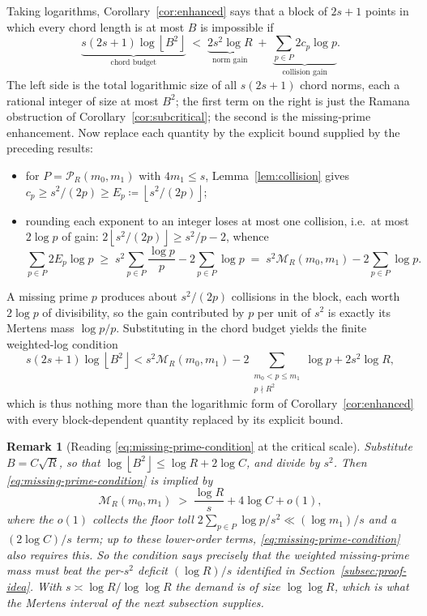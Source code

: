 \documentclass[11pt]{article}
\newtheorem{remark}[theorem]{Remark}
\newcommand{\floor}[1]{\left\lfloor #1 \right\rfloor}
\newcommand{\M}{\mathcal M}
\begin{document}
Taking logarithms, Corollary~\ref{cor:enhanced} says that a block of \(2s+1\) points in which every chord length is at most \(B\) is impossible if
\[
  \underbrace{s(2s+1)\log \floor{B^2}}_{\text{chord budget}}
  \;<\;
  \underbrace{2s^2\log R}_{\text{norm gain}}
  \;+\;
  \underbrace{\sum_{p\in P}2c_p\log p}_{\text{collision gain}}.
\]
The left side is the total logarithmic size of all \(s(2s+1)\) chord norms, each a rational integer of size at most \(B^2\); the first term on the right is just the Ramana obstruction of Corollary~\ref{cor:subcritical}; the second is the missing-prime enhancement.
Now replace each quantity by the explicit bound supplied by the preceding results:
\begin{itemize}[leftmargin=2em]
\item for \(P=\mathcal P_R(m_0,m_1)\) with \(4m_1\le s\), Lemma~\ref{lem:collision} gives \(c_p\ge s^2/(2p)\ge E_p\coloneq\floor{s^2/(2p)}\);
\item rounding each exponent to an integer loses at most one collision, i.e.\ at most \(2\log p\) of gain: \(2\floor{s^2/(2p)}\ge s^2/p-2\), whence
\[
  \sum_{p\in P}2E_p\log p
  \;\ge\;
  s^2\sum_{p\in P}\frac{\log p}{p}-2\sum_{p\in P}\log p
  \;=\;
  s^2\M_R(m_0,m_1)-2\sum_{p\in P}\log p .
\]
\end{itemize}
A missing prime \(p\) produces about \(s^2/(2p)\) collisions in the block, each worth \(2\log p\) of divisibility, so the gain contributed by \(p\) per unit of \(s^2\) is exactly its Mertens mass \(\log p/p\).
Substituting in the chord budget yields the finite weighted-log condition
\[
  s(2s+1)\log \floor{B^2}
  <
  s^2\M_R(m_0,m_1)-2\sum_{\substack{m_0<p\le m_1\\p\nmid R^2}}\log p
  +2s^2\log R ,
  \tag{MP}\label{eq:missing-prime-condition}
\]
which is thus nothing more than the logarithmic form of Corollary~\ref{cor:enhanced} with every block-dependent quantity replaced by its explicit bound.

\begin{remark}[Reading \eqref{eq:missing-prime-condition} at the critical
scale]\label{rem:mp-critical} Substitute \(B=C\sqrt R\), so that \(\log\floor{B^2}\le\log R+2\log C\), and divide by \(s^2\).
Then \eqref{eq:missing-prime-condition} is implied by
\[
  \M_R(m_0,m_1)
  \;>\;
  \frac{\log R}{s}+4\log C+o(1),
\]
where the \(o(1)\) collects the floor toll \(2\sum_{p\in P}\log p/s^2\ll(\log m_1)/s\) and a \((2\log C)/s\) term; up to these lower-order terms, \eqref{eq:missing-prime-condition} also requires this.
So the condition says precisely that the weighted missing-prime mass must beat the per-\(s^2\) deficit \((\log R)/s\) identified in Section~\ref{subsec:proof-idea}.
With \(s\asymp\log R/\log\log R\) the demand is of size \(\log\log R\), which is what the Mertens interval of the next subsection supplies.
\end{remark}
\end{document}
